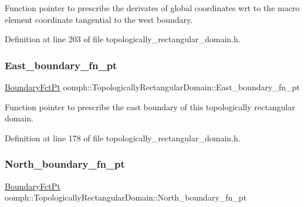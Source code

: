 Function pointer to prescribe the derivates of global coordinates wrt to the macro element coordinate tangential to the west boundary. 



Definition at line 203 of file topologically\+\_\+rectangular\+\_\+domain.\+h.

\mbox{\label{classoomph_1_1TopologicallyRectangularDomain_ac6f1166ec8fd2e62704512bfb612dfb4}} 
\subsubsection{\texorpdfstring{East\+\_\+boundary\+\_\+fn\+\_\+pt}{East\_boundary\_fn\_pt}}
{\footnotesize\ttfamily \hyperlink{classoomph_1_1TopologicallyRectangularDomain_a8b2e24f5500d86c93aef509c5410e7cc}{Boundary\+Fct\+Pt} oomph\+::\+Topologically\+Rectangular\+Domain\+::\+East\+\_\+boundary\+\_\+fn\+\_\+pt\hspace{0.3cm}{\ttfamily [private]}}



Function pointer to prescribe the east boundary of this topologically rectangular domain. 



Definition at line 178 of file topologically\+\_\+rectangular\+\_\+domain.\+h.

\mbox{\label{classoomph_1_1TopologicallyRectangularDomain_a78adac085b81bd6efed96c43f9c1f8a2}} 
\subsubsection{\texorpdfstring{North\+\_\+boundary\+\_\+fn\+\_\+pt}{North\_boundary\_fn\_pt}}
{\footnotesize\ttfamily \hyperlink{classoomph_1_1TopologicallyRectangularDomain_a8b2e24f5500d86c93aef509c5410e7cc}{Boundary\+Fct\+Pt} oomph\+::\+Topologically\+Rectangular\+Domain\+::\+North\+\_\+boundary\+\_\+fn\+\_\+pt\hspace{0.3cm}{\ttfamily [private]}}



